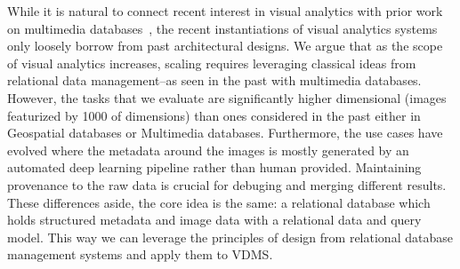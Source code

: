 While it is natural to connect recent interest in visual analytics with prior work on multimedia databases~\cite{yoshitaka1999survey}, the recent instantiations of visual analytics systems only loosely borrow from past architectural designs.
We argue that as the scope of  visual analytics increases, scaling requires leveraging classical ideas from relational data management--as seen in the past with multimedia databases.
However, the tasks that we evaluate are significantly higher dimensional (images featurized by 1000 of dimensions) than ones considered in the past either in Geospatial databases or Multimedia databases.
Furthermore, the use cases have evolved where the metadata around the images is mostly generated by an automated deep learning pipeline rather than human provided.
Maintaining provenance to the raw data is crucial for debuging and merging different results. 
These differences aside, the core idea is the same: a relational database which holds structured metadata and image data with a relational data and query model. 
This way we can leverage the principles of design from relational database management systems and apply them to VDMS.










